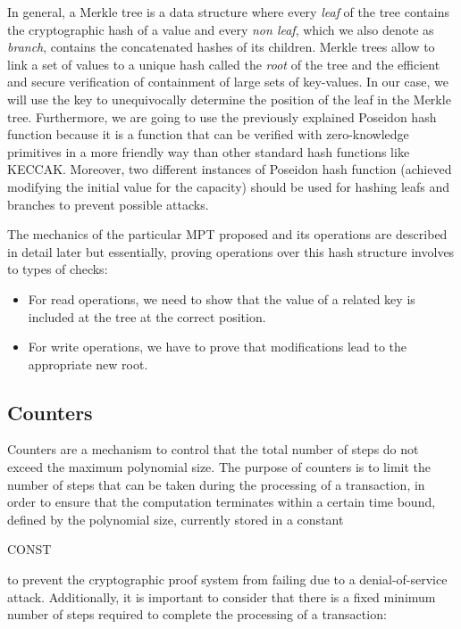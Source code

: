 In general, a Merkle tree is a data structure where every \emph{leaf} of the tree contains the cryptographic hash of a value and every \emph{non leaf}, which we also denote as \emph{branch}, contains the concatenated hashes of its children. Merkle trees allow to link a set of values to a unique hash called the \emph{root} of the tree and the efficient and secure verification of containment of large sets of key-values. In our case, we will use the key to unequivocally determine the position of the leaf in the Merkle tree. Furthermore, we are going to use the previously explained Poseidon hash function because it is a function that can be verified with zero-knowledge primitives in a more friendly way than other standard hash functions like KECCAK. Moreover, two different instances of Poseidon hash function (achieved modifying the initial value for the capacity) should be used for hashing leafs and branches to prevent possible attacks. 

The mechanics of the particular MPT proposed and its operations are described in detail later but essentially, proving operations over this hash structure involves to types of checks:

\begin{itemize}
    
    \item For read operations, we need to show that the value of a related key is included at the tree at the correct position.
    
    \item For write operations, we have to prove that modifications lead to the appropriate new root.
    
\end{itemize}




\subsection{Counters}

Counters are a mechanism to control that the total number of steps do not exceed the maximum polynomial size. The purpose of counters is to limit the number of steps that can be taken during the processing of a transaction, in order to ensure that the computation terminates within a certain time bound, defined by the polynomial size, currently stored in a constant

\begin{zkasm}
    CONST %
\end{zkasm}
to prevent the cryptographic proof system from failing due to a denial-of-service attack. Additionally, it is important to consider that there is a fixed minimum number of steps required to complete the processing of a transaction:

